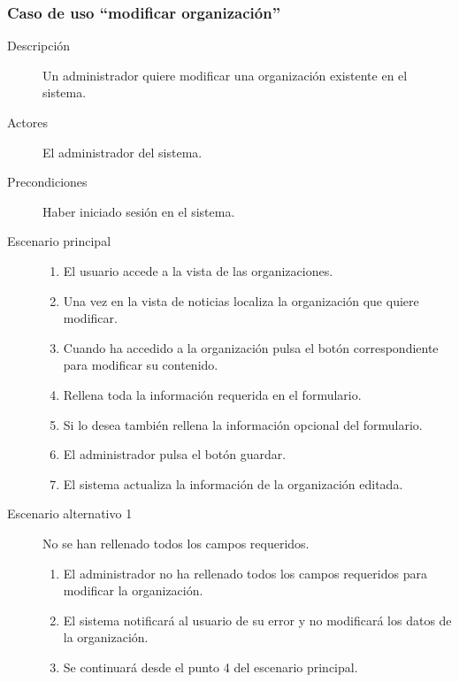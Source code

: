 \subsubsection{Caso de uso ``modificar organización''}
\begin{description}
\item[Descripción]  Un administrador quiere modificar una organización existente en el sistema.
\item[Actores]  El administrador del sistema.
\item[Precondiciones] Haber iniciado sesión en el sistema.
\item[Escenario principal]	\hfill
							\begin{enumerate}
							\item El usuario accede a la vista de las organizaciones.
							\item Una vez en la vista de noticias localiza la organización que quiere modificar.
							\item Cuando ha accedido a la organización pulsa el botón correspondiente para modificar su contenido.
							\item Rellena toda la información requerida en el formulario.
							\item Si lo desea también rellena la información opcional del formulario.
							\item El administrador pulsa el botón guardar.
							\item El sistema actualiza la información de la organización editada.
							\end{enumerate}
\item[Escenario alternativo 1] No se han rellenado todos los campos requeridos.
							\begin{enumerate}
							\item El administrador no ha rellenado todos los campos requeridos para modificar la organización.
							\item El sistema notificará al usuario de su error y no modificará los datos de la organización.
							\item Se continuará desde el punto 4 del escenario principal.
							\end{enumerate}
\end{description}


